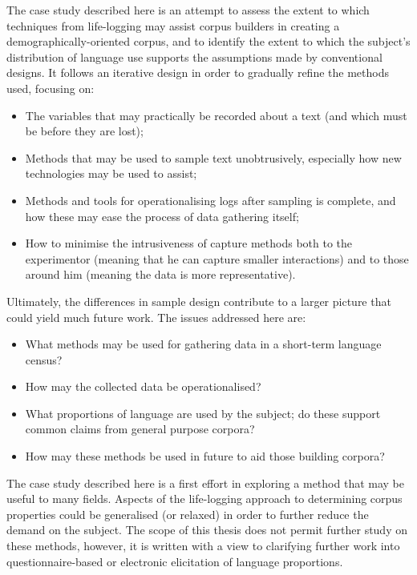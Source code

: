 
The case study described here is an attempt to assess the extent to which techniques from life-logging may assist corpus builders in creating a demographically-oriented corpus, and to identify the extent to which the subject's distribution of language use supports the assumptions made by conventional designs.  It follows an iterative design in order to gradually refine the methods used, focusing on:

\begin{itemize}
    \item The variables that may practically be recorded about a text (and which must be before they are lost);
    \item Methods that may be used to sample text unobtrusively, especially how new technologies may be used to assist;
    \item Methods and tools for operationalising logs after sampling is complete, and how these may ease the process of data gathering itself;
    \item How to minimise the intrusiveness of capture methods both to the experimentor (meaning that he can capture smaller interactions) and to those around him (meaning the data is more representative).
\end{itemize}

Ultimately, the differences in sample design contribute to a larger picture that could yield much future work.  The issues addressed here are:

\begin{itemize}
    \item What methods may be used for gathering data in a short-term language census?
    \item How may the collected data be operationalised?
    \item What proportions of language are used by the subject; do these support common claims from general purpose corpora?
    \item How may these methods be used in future to aid those building corpora?
\end{itemize}


The case study described here is a first effort in exploring a method that may be useful to many fields.  Aspects of the life-logging approach to determining corpus properties could be generalised (or relaxed) in order to further reduce the demand on the subject.  The scope of this thesis does not permit further study on these methods, however, it is written with a view to clarifying further work into questionnaire-based or electronic elicitation of language proportions.






